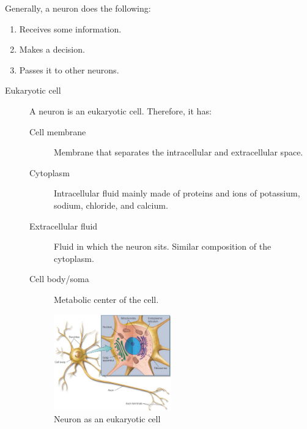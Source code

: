 Generally, a neuron does the following:
\begin{enumerate}
    \item Receives some information.
    \item Makes a decision.
    \item Passes it to other neurons.
\end{enumerate}

\begin{description}
    \item[Eukaryotic cell] 
        A neuron is an eukaryotic cell. Therefore, it has:
        \begin{description}
            \item[Cell membrane] Membrane that separates the intracellular and extracellular space.
            \item[Cytoplasm] Intracellular fluid mainly made of proteins and ions of potassium, sodium, chloride, and calcium.
            \item[Extracellular fluid] Fluid in which the neuron sits. Similar composition of the cytoplasm.
            \item[Cell body/soma] Metabolic center of the cell.
        \end{description}

        \begin{figure}[h]
            \centering
            \includegraphics[width=0.5\textwidth]{img/neuron_eukaryotic.png}
            \caption{Neuron as an eukaryotic cell}
        \end{figure}
\end{description}

